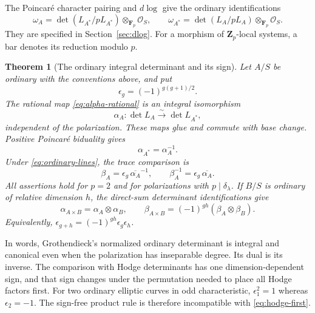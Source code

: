 \documentclass[11pt]{article}
\newtheorem{theorem}{Theorem}[section]
\theoremstyle{definition}\newtheorem{definition}[theorem]{Definition}
\theoremstyle{remark}\newtheorem{remark}[theorem]{Remark}
\newcommand{\OO}{\mathcal O}
\newcommand{\ZZ}{\mathbf Z}
\newcommand{\FF}{\mathbf F}
\begin{document}
The Poincar\'e character pairing and $d\log$ give the ordinary identifications
\begin{equation}\label{eq:ordinary-lines}
 \omega_A=\det(L_{A^*}/pL_{A^*})\otimes_{\FF_p}\OO_S,
 \qquad
 \omega_{A^*}=\det(L_A/pL_A)\otimes_{\FF_p}\OO_S.
\end{equation}
They are specified in Section~\ref{sec:dlog}. For a morphism of $\ZZ_p$-local systems, a bar denotes its reduction modulo $p$.

\begin{theorem}[The ordinary integral determinant and its sign]\label{thm:D}
Let $A/S$ be ordinary with the conventions above, and put
\[
 \epsilon_g=(-1)^{g(g+1)/2}.
\]
The rational map \eqref{eq:alpha-rational} is an integral isomorphism
\[
 \alpha_A:\det L_A\xrightarrow{\sim}\det L_{A^*},
\]
independent of the polarization. These maps glue and commute with base change. Positive Poincar\'e biduality gives
\begin{equation}\label{eq:bidual-main}
 \alpha_{A^*}=\alpha_A^{-1}.
\end{equation}
Under \eqref{eq:ordinary-lines}, the trace comparison is
\begin{equation}\label{eq:D}
 \beta_A=\epsilon_g\,\overline{\alpha_A}^{-1},
 \qquad \beta_A^{-1}=\epsilon_g\,\overline{\alpha_A}.
\end{equation}
All assertions hold for $p=2$ and for polarizations with $p\mid\delta_\lambda$. If $B/S$ is ordinary of relative dimension $h$, the direct-sum determinant identifications give
\begin{equation}\label{eq:product-main}
 \alpha_{A\times B}=\alpha_A\otimes\alpha_B,\qquad
 \beta_{A\times B}=(-1)^{gh}(\beta_A\otimes\beta_B).
\end{equation}
Equivalently, $\epsilon_{g+h}=(-1)^{gh}\epsilon_g\epsilon_h$.
\end{theorem}

In words, Grothendieck's normalized ordinary determinant is integral and canonical even when the polarization has inseparable degree. Its dual is its inverse. The comparison with Hodge determinants has one dimension-dependent sign, and that sign changes under the permutation needed to place all Hodge factors first. For two ordinary elliptic curves in odd characteristic, $\epsilon_1^2=1$ whereas $\epsilon_2=-1$. The sign-free product rule is therefore incompatible with \eqref{eq:hodge-first}.
\end{document}
